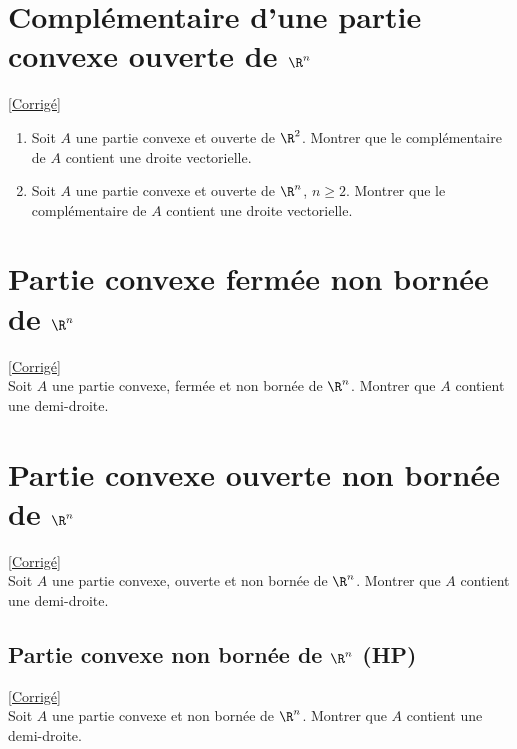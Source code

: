 \documentclass{book}
\begin{document}
\section{Complémentaire d'une partie convexe ouverte de $\R^n$ }
\label{Complémentaire d'une partie convexe ouverte de R^n}
\textcolor{blue}{\hyperref[Complémentaire d'une partie convexe ouverte de R^n corrigé]{[Corrigé]}}\\
\begin{enumerate}[leftmargin=*]
	\item Soit $A$ une partie convexe et ouverte de $\R^2$. Montrer que le complémentaire de $A$ contient une droite vectorielle.
	\item Soit $A$ une partie convexe et ouverte de $\R^n$, $n\geq 2$. Montrer que le complémentaire de $A$ contient une droite vectorielle.
\end{enumerate}

\section{Partie convexe fermée non bornée de $\R^n$ }
\label{Partie convexe fermée non bornée de R^n}
\textcolor{blue}{\hyperref[Partie convexe fermée non bornée de R^n corrigé]{[Corrigé]}}\\
Soit $A$ une partie convexe, fermée et non bornée de $\R^n$. Montrer que $A$ contient une demi-droite.

\section{Partie convexe ouverte non bornée de $\R^n$ }
\label{Partie convexe ouverte non bornée de R^n}
\textcolor{blue}{\hyperref[Partie convexe ouverte non bornée de R^n corrigé]{[Corrigé]}}\\
Soit $A$ une partie convexe, ouverte et non bornée de $\R^n$. Montrer que $A$ contient une demi-droite.

\subsection{Partie convexe non bornée de $\R^n$ (HP) }
\label{Partie convexe non bornée de R^n}
\textcolor{blue}{\hyperref[Partie convexe non bornée de R^n corrigé]{[Corrigé]}}\\
Soit $A$ une partie convexe et non bornée de $\R^n$. Montrer que $A$ contient une demi-droite.
\end{document}
